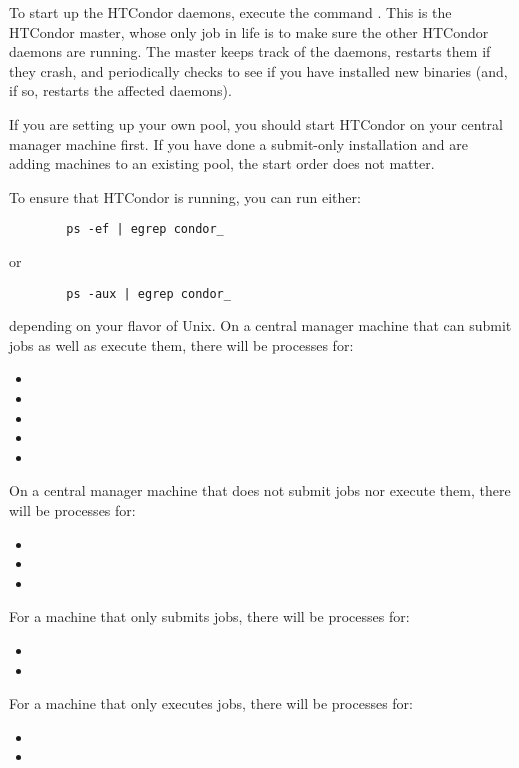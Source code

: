 To start up the HTCondor daemons, execute the command
.  This is the HTCondor master, whose
only job in life is to make sure the other HTCondor daemons are running.
The master keeps track of the daemons, restarts them if they crash,
and periodically checks to see if you have installed new binaries (and,
if so, restarts the affected daemons).

If you are setting up your own pool, you should start HTCondor on your
central manager machine first.  If you have done a submit-only
installation and are adding machines to an existing pool,
the start order does not
matter.

To ensure that HTCondor is running, you can run either:
\begin{verbatim}
        ps -ef | egrep condor_
\end{verbatim}
or
\begin{verbatim}
        ps -aux | egrep condor_
\end{verbatim}
depending on your flavor of Unix.  
On a central manager machine that can submit jobs as well
as execute them, there will be processes for:
\begin{itemize}
	\item {}
	\item {}
	\item {}
	\item {}
	\item {}
\end{itemize}
On a central manager machine that does not submit jobs nor
execute them, there will be processes for:
\begin{itemize}
	\item {}
	\item {}
	\item {}
\end{itemize}
For a machine that only submits jobs, there will be processes for:
\begin{itemize}
	\item {}
	\item {}
\end{itemize}
For a machine that only executes jobs, there will be processes for:
\begin{itemize}
	\item {}
	\item {}
\end{itemize}

